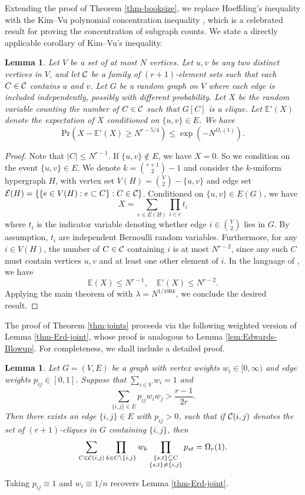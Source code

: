 \documentclass[11pt,a4paper]{article}
\newtheorem{lemma}[theorem]{Lemma}
\theoremstyle{definition}
\theoremstyle{remark}
\newcommand{\C}[1]{{\protect\mathcal{#1}}}
\newcommand{\EE}{\mathbb E}
\newcommand*{\abs}[1]{\lvert#1\rvert}
\begin{document}
Extending the proof of Theorem \ref{thm-booksize}, 
we replace Hoeffding's inequality with the Kim--Vu polynomial concentration inequality \cite{KV2000}, which is a celebrated result for proving the concentration of subgraph counts. We state a directly applicable corollary of Kim--Vu's inequality.
\begin{lemma}
\label{lem:KV-corollary}
Let $V$ be a set of at most $N$ vertices. Let $u, v$ be any two distinct vertices in $V$, and let $\C C$ be a family of $(r + 1)$-element sets such that each $C \in \C C$ contains $u$ and $v$. Let $G$ be a random graph on $V$ where each edge is included independently, possibly with different probability. Let $X$ be the random variable counting the number of $C \in \C C$ such that $G[C]$ is a clique. Let $\EE'(X)$ denote the expectation of $X$ conditioned on $\{u,v\} \in E$. We have
$$\mathrm{Pr}\left(X - \EE'(X) \geq N^{r - 5/4} \right) \leq \exp(-N^{\Omega_r(1)}).$$
\end{lemma}
\begin{proof}
    Note that $\abs{C} \leq N^{r - 1}$. If $\{u,v\} \notin E$, we have $X = 0$. So we condition on the event $\{u,v\} \in E$. 
   We denote $k = \binom{r + 1}{2} - 1$ and  consider the $k$-uniform hypergraph $H$, with vertex set $V(H) = \binom{V}{2} - \{u, v\}$ and edge set $\C E(H) = \{\{e \in V(H): e \subset C\}: C \in \C C\}$. Conditioned on $\{u,v\} \in E(G)$, we have
    $$X = \sum_{e \in E(H)} \prod_{i \in e} t_i$$
    where $t_i$ is the indicator variable denoting whether edge $i \in \binom{V}{2}$ lies in $G$. By assumption, $t_i$ are independent Bernoulli random variables. Furthermore, for any $i \in V(H)$, the number of $C \in \C C$ containing $i$ is at most $N^{r - 2}$, since any such $C$ must contain vertices $u, v$ and at least one other element of $i$. In the language of \cite{KV2000}, we have
    $$\EE(X) \leq N^{r - 1}, \quad \EE'(X) \leq N^{r - 2}.$$
    Applying the main theorem of \cite{KV2000} with $\lambda = N^{1 / 100k}$, we conclude the desired result.
\end{proof}

The proof of Theorem \ref{thm:joints} 
proceeds via the following weighted version of Lemma \ref{thm-Erd-joint}, whose proof is analogous to Lemma \ref{lem:Edwards-Blowup}. 
For completeness, we shall include a detailed proof. 

\begin{lemma}
    \label{lem:joints-Blowup}
    Let $G=(V,E)$ be a graph with vertex weights $w_i \in [0, \infty)$ and edge weights $p_{ij} \in [0, 1]$. Suppose that $\sum_{i\in V} w_i = 1$ and 
    $$\sum_{\{i,j\} \in E} p_{ij}w_i w_j > \frac{r - 1}{2r}.$$
    Then there exists an edge $\{i,j\} \in E$ with $p_{ij} > 0$, such that if $\C C(i, j)$ denotes the set of $(r + 1)$-cliques in $G$ containing $\{i, j\}$, then
    $$\sum_{C \in \C C(i, j)} \prod_{k \in C\setminus \{i,j\}} w_{k} 
    \prod_{\substack{\{s,t\}\subseteq C \\
      \{s,t\} \neq \{i,j\} }} p_{st} = \Omega_r(1).$$
\end{lemma}
Taking $p_{ij}\equiv 1$ and $w_i \equiv {1}/{n}$ recovers Lemma \ref{thm-Erd-joint}.
\end{document}
